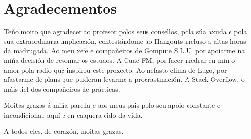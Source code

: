 %
%
\chapter*{Agradecementos}
\vspace*{2cm}

Teño moito que agradecer ao profesor {\director} polos seus consellos, pola súa axuda e pola súa extraordinaria implicación, contestándome ao Hangouts incluso a altas horas da madrugada. Ao meu xefe e compañeiros de Gompute S.L.U. por apoiarme na miña decisión de retomar os estudos. A Cuac FM, por facer medrar en min o amor pola radio que inspirou este proxecto. Ao nefasto clima de Lugo, por afastarme de plans que puideran levarme a procrastinación. A Stack Overflow, o máis fiel dos compañeiros de prácticas.

Moitas grazas á miña parella e aos meus pais polo seu apoio constante e incondicional, aquí e en calquera eido da vida.

A todos eles, de corazón, moitas grazas.
